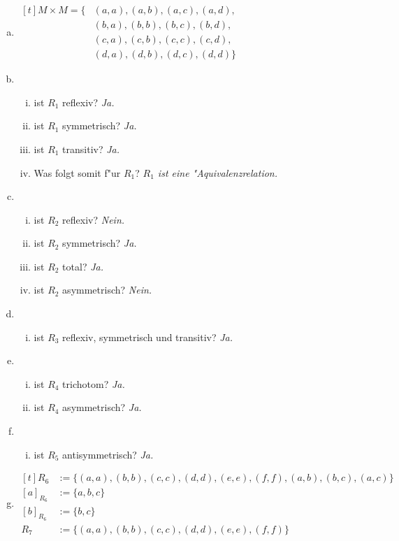 \documentclass[10pt, oneside]{article}
\begin{document}
\begin{enumerate}[(a)]
    \item $\begin{aligned}[t]
            M \times M = \{&(a, a), (a, b), (a, c), (a, d), \\
                           &(b, a), (b, b), (b, c), (b, d), \\
                           &(c, a), (c, b), (c, c), (c, d), \\
                           &(d, a), (d, b), (d, c), (d, d)\}
           \end{aligned}$
    \item
        \begin{enumerate}[i)]
            \item ist $R_1$ reflexiv? \textit{Ja.}
            \item ist $R_1$ symmetrisch? \textit{Ja.}
            \item ist $R_1$ transitiv? \textit{Ja.}
            \item Was folgt somit f"ur $R_1$? \textit{$R_1$ ist eine "Aquivalenzrelation.}
        \end{enumerate}
    \item
        \begin{enumerate}[i)]
            \item ist $R_2$ reflexiv? \textit{Nein.}
            \item ist $R_2$ symmetrisch? \textit{Ja.}
            \item ist $R_2$ total? \textit{Ja.}
            \item ist $R_2$ asymmetrisch? \textit{Nein.}
        \end{enumerate}
    \item
        \begin{enumerate}[i)]
            \item ist $R_3$ reflexiv, symmetrisch und transitiv? \textit{Ja.}
        \end{enumerate}
    \item
        \begin{enumerate}[i)]
            \item ist $R_4$ trichotom? \textit{Ja.}
            \item ist $R_4$ asymmetrisch? \textit{Ja.}
        \end{enumerate}
    \item
        \begin{enumerate}[i)]
            \item ist $R_5$ antisymmetrisch? \textit{Ja.}
        \end{enumerate}
    \item
        $\begin{aligned}[t]
            R_6 &:= \{(a, a), (b, b), (c, c), (d, d), (e, e), (f, f), (a, b), (b, c), (a, c)\} \\
            [a]_{R_6} &:= \{a, b, c\} \\
            [b]_{R_6} &:= \{b, c\} \\
            R_7 &:= \{(a, a), (b, b), (c, c), (d, d), (e, e), (f, f)\}
        \end{aligned}$
\end{enumerate}
\end{document}
